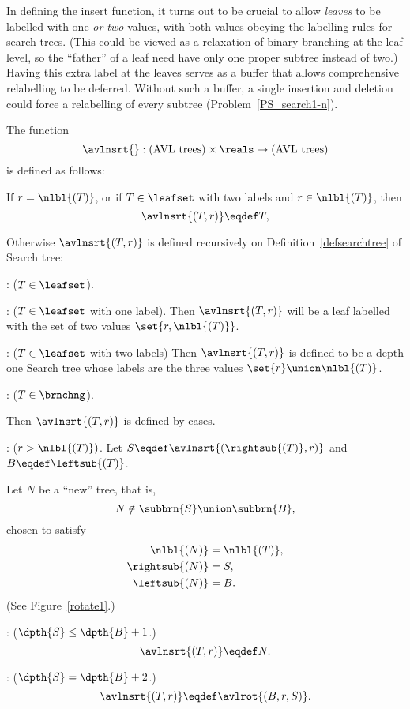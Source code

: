 \begin{definition}
In defining the insert function, it turns out to be crucial to allow
\emph{leaves} to be labelled with one \emph{or two} values, with both
values obeying the labelling rules for search trees.  (This could be
viewed as a relaxation of binary branching at the leaf level, so the
``father'' of a leaf need have only one proper subtree instead of
two.)  Having this extra label at the leaves serves as a buffer that
allows comprehensive relabelling to be deferred.  Without such a
buffer, a single insertion and deletion could force a relabelling of
every subtree (Problem~\ref{PS_search1-n}).

\begin{definition}
The function
\[
\avlnsrt{}: \text{(AVL trees)} \times \reals \to \text{(AVL trees)}
\]
is defined as follows:

If $r = \nlbl{(T)}$, or if $T \in \leafset$ with two labels and $r \in
\nlbl{(T)}$, then
\[
\avlnsrt{(T,r)} \eqdef T,
\]

Otherwise $\avlnsrt{(T,r)}$ is defined recursively on
Definition~\ref{defsearchtree} of Search tree:

: ($T \in \leafset$).

: ($T \in \leafset$ with one label).  Then
$\avlnsrt{(T,r)}$ will be a leaf labelled with the set of two values
$\set{r,\nlbl{(T)}}$.

: ($T \in \leafset$ with two labels) Then
$\avlnsrt{(T,r)}$ is defined to be a depth one Search tree whose
labels are the three values $\set{r} \union \nlbl{(T)}$.

: ($T \in \brnchng$).  

Then $\avlnsrt{(T,r)}$ is defined by cases.

: ($r > \nlbl{(T)})$.  Let $S \eqdef
\avlnsrt{(\rightsub{(T)}, r)}$ and $B \eqdef \leftsub{(T)}$.

Let $N$ be a ``new'' tree, that is,
\[
N \notin \subbrn{S} \union \subbrn{B},
\]
chosen to satisfy
\begin{align}
\nlbl{(N)} & = \nlbl{(T)},\\
\rightsub{(N)} & = S,\\
\leftsub{(N)} & = B.
\end{align}
(See Figure~\ref{rotate1}.)

: ($\dpth{S} \leq \dpth{B}+1$.)
\[
\avlnsrt{(T,r)} \eqdef N.
\]

: ($\dpth{S} = \dpth{B}+2$.)
\[
\avlnsrt{(T,r)} \eqdef \avlrot{(B,r,S)}.
\]


\end{definition}
\end{definition}
